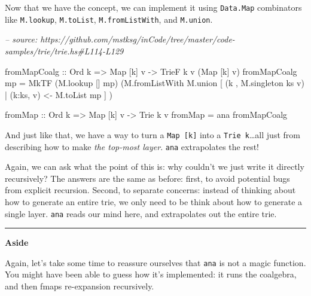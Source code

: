 \documentclass[]{article}
\newenvironment{Shaded}{}{}
\newcommand{\CommentTok}[1]{\textcolor[rgb]{0.38,0.63,0.69}{\textit{#1}}}
\newcommand{\DataTypeTok}[1]{\textcolor[rgb]{0.56,0.13,0.00}{#1}}
\newcommand{\FunctionTok}[1]{\textcolor[rgb]{0.02,0.16,0.49}{#1}}
\newcommand{\NormalTok}[1]{#1}
\newcommand{\OtherTok}[1]{\textcolor[rgb]{0.00,0.44,0.13}{#1}}
\begin{document}
Now that we have the concept, we can implement it using \texttt{Data.Map}
combinators like \texttt{M.lookup}, \texttt{M.toList}, \texttt{M.fromListWith},
and \texttt{M.union}.

\begin{Shaded}
\begin{Highlighting}[]
\CommentTok{-- source: https://github.com/mstksg/inCode/tree/master/code-samples/trie/trie.hs#L114-L129}

\NormalTok{fromMapCoalg}
\OtherTok{    ::} \DataTypeTok{Ord}\NormalTok{ k}
    \OtherTok{=>} \DataTypeTok{Map}\NormalTok{ [k] v}
    \OtherTok{->} \DataTypeTok{TrieF}\NormalTok{ k v (}\DataTypeTok{Map}\NormalTok{ [k] v)}
\NormalTok{fromMapCoalg mp }\FunctionTok{=} \DataTypeTok{MkTF}\NormalTok{ (M.lookup [] mp)}
\NormalTok{                       (M.fromListWith M.union}
\NormalTok{                          [ (k   , M.singleton ks v)}
                          \FunctionTok{|}\NormalTok{ (k}\FunctionTok{:}\NormalTok{ks, v) }\OtherTok{<-}\NormalTok{ M.toList mp}
\NormalTok{                          ]}
\NormalTok{                       )}

\NormalTok{fromMap}
\OtherTok{    ::} \DataTypeTok{Ord}\NormalTok{ k}
    \OtherTok{=>} \DataTypeTok{Map}\NormalTok{ [k] v}
    \OtherTok{->} \DataTypeTok{Trie}\NormalTok{ k v}
\NormalTok{fromMap }\FunctionTok{=}\NormalTok{ ana fromMapCoalg}
\end{Highlighting}
\end{Shaded}

And just like that, we have a way to turn a \texttt{Map\ {[}k{]}} into a
\texttt{Trie\ k}\ldots{}all just from describing how to make \emph{the top-most
layer}. \texttt{ana} extrapolates the rest!

Again, we can ask what the point of this is: why couldn't we just write it
directly recursively? The answers are the same as before: first, to avoid
potential bugs from explicit recursion. Second, to separate concerns: instead of
thinking about how to generate an entire trie, we only need to be think about
how to generate a single layer. \texttt{ana} reads our mind here, and
extrapolates out the entire trie.

\begin{center}\rule{0.5\linewidth}{\linethickness}\end{center}

\textbf{Aside}

Again, let's take some time to reassure ourselves that \texttt{ana} is not a
magic function. You might have been able to guess how it's implemented: it runs
the coalgebra, and then fmaps re-expansion recursively.
\end{document}
